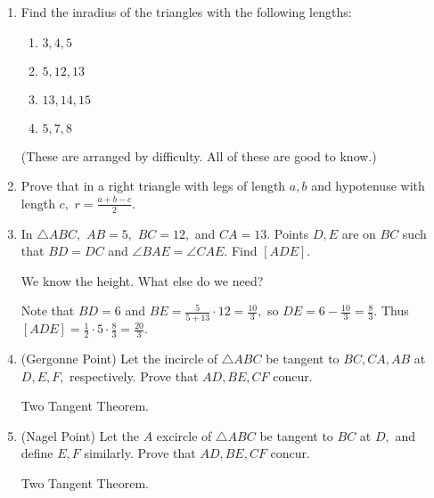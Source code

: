 \begin{enumerate}

    \item Find the inradius of the triangles with the following lengths:
    
    \begin{enumerate}
        \item $3,4,5$
        
        \item $5,12,13$
        
        \item $13,14,15$
        
        \item $5,7,8$
    \end{enumerate}

    (These are arranged by difficulty. All of these are good to know.)
    
    \item Prove that in a right triangle with legs of length $a,b$ and hypotenuse with length $c,$ $r=\frac{a+b-c}{2}.$

    \item In $\triangle ABC,$ $AB=5,$ $BC=12,$ and $CA=13.$ Points $D,E$ are on $BC$ such that $BD=DC$ and $\angle BAE=\angle CAE.$ Find $[ADE].$
    \begin{hint}
    \begin{addhint}
    {We know the height. What else do we need?}
    \end{addhint}
    \end{hint}
    \begin{solu}
    \begin{addsol}
    {Note that $BD=6$ and $BE=\frac{5}{5+13}\cdot 12=\frac{10}{3},$ so $DE=6-\frac{10}{3}=\frac{8}{3}.$ Thus $[ADE]=\frac{1}{2}\cdot 5\cdot \frac{8}{3}=\frac{20}{3}.$}
    \end{addsol}
    \end{solu}

    \item (Gergonne Point) Let the incircle of $\triangle ABC$ be tangent to $BC,CA,AB$ at $D,E,F,$ respectively. Prove that $AD,BE,CF$ concur.
    \begin{hint}
    \begin{addhint}
    {Two Tangent Theorem.}
    \end{addhint}
    \end{hint}
    
    \item (Nagel Point) Let the $A$ excircle of $\triangle ABC$ be tangent to $BC$ at $D,$ and define $E,F$ similarly. Prove that $AD,BE,CF$ concur.
    \begin{hint}
    \begin{addhint}
    {Two Tangent Theorem.}
    \end{addhint}
    \end{hint}


\end{enumerate}

